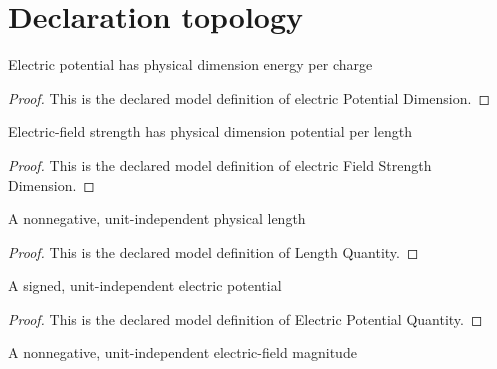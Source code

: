 \section{Declaration topology}
\begin{definition}
  \label{def:physics:phyx-mini-0870:phyxminiproblems-problemphyxmini0870-electricpotentialdimension}
  Electric potential has physical dimension energy per charge
\end{definition}
\begin{proof}
  This is the declared model definition of electric Potential Dimension.
\end{proof}
\begin{definition}
  \label{def:physics:phyx-mini-0870:phyxminiproblems-problemphyxmini0870-electricfieldstrengthdimension}
  Electric-field strength has physical dimension potential per length
\end{definition}
\begin{proof}
  This is the declared model definition of electric Field Strength Dimension.
\end{proof}
\begin{definition}
  \label{def:physics:phyx-mini-0870:phyxminiproblems-problemphyxmini0870-lengthquantity}
  A nonnegative, unit-independent physical length
\end{definition}
\begin{proof}
  This is the declared model definition of Length Quantity.
\end{proof}
\begin{definition}
  \label{def:physics:phyx-mini-0870:phyxminiproblems-problemphyxmini0870-electricpotentialquantity}
  A signed, unit-independent electric potential
\end{definition}
\begin{proof}
  This is the declared model definition of Electric Potential Quantity.
\end{proof}
\begin{definition}
  \label{def:physics:phyx-mini-0870:phyxminiproblems-problemphyxmini0870-electricfieldstrengthquantity}
  A nonnegative, unit-independent electric-field magnitude
\end{definition}

